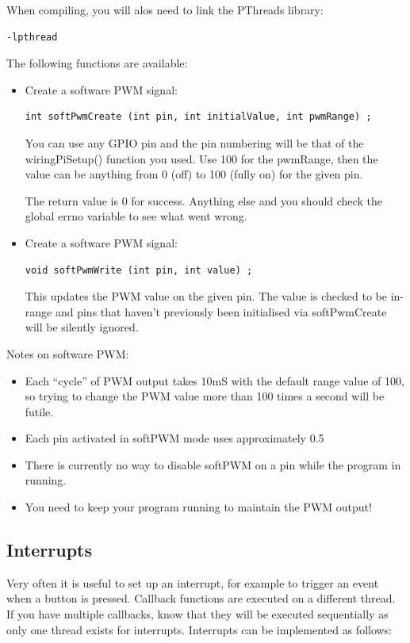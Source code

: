 When compiling, you will alos need to link the PThreads library:
\begin{lstlisting}
-lpthread
\end{lstlisting}

The following functions are available:
\begin{itemize}
    \item Create a software PWM signal:
        \begin{lstlisting}[gobble=8]
        int softPwmCreate (int pin, int initialValue, int pwmRange) ;
        \end{lstlisting}
        You can use any GPIO pin and the pin numbering will be that of the wiringPiSetup() function you used. Use 100 for the pwmRange, then the value can be anything from 0 (off) to 100 (fully on) for the given pin.

        The return value is 0 for success. Anything else and you should check the global errno variable to see what went wrong.
    \item Create a software PWM signal:
        \begin{lstlisting}[gobble=8]
        void softPwmWrite (int pin, int value) ;
        \end{lstlisting}
        This updates the PWM value on the given pin. The value is checked to be in-range and pins that haven’t previously been initialised via softPwmCreate will be silently ignored.
\end{itemize}

Notes on software PWM:
\begin{itemize}
    \item Each “cycle” of PWM output takes 10mS with the default range value of 100, so trying to change the PWM value more than 100 times a second will be futile.
    \item Each pin activated in softPWM mode uses approximately 0.5%
    \item There is currently no way to disable softPWM on a pin while the program in running.
    \item You need to keep your program running to maintain the PWM output!
\end{itemize}


\subsection{Interrupts} 
Very often it is useful to set up an interrupt, for example to trigger an event when a button is pressed. Callback functions are executed on a different thread. If you have multiple callbacks, know that they will be executed sequentially as only one thread exists for interrupts. Interrupts can be implemented as follows:

